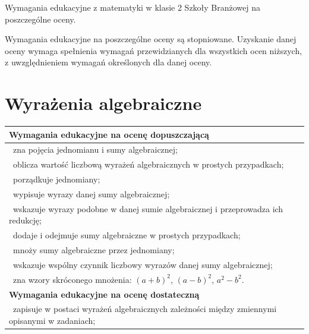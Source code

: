 \documentclass[12pt,a4paper]{article}
\begin{document}
	
	\begin{center}
		\Large Wymagania edukacyjne z matematyki w klasie 2 Szkoły Branżowej na poszczególne oceny.
	\end{center}
	
	Wymagania edukacyjne na poszczególne oceny są stopniowane.
	Uzyskanie danej oceny wymaga spełnienia wymagań przewidzianych
	dla wszystkich ocen niższych, z uwzględnieniem wymagań
	określonych dla danej oceny.
	
	\section{Wyrażenia algebraiczne}
	
	\begin{longtable}{|p{16cm}|}
		\hline
		
		\textbf{Wymagania edukacyjne na ocenę dopuszczającą} \\ \hline
		
		\textbullet\ zna pojęcia jednomianu i sumy algebraicznej; \\
		
		\textbullet\ oblicza wartość liczbową wyrażeń algebraicznych w prostych przypadkach; \\
		
		\textbullet\ porządkuje jednomiany; \\
		
		\textbullet\ wypisuje wyrazy danej sumy algebraicznej; \\
		
		\textbullet\ wskazuje wyrazy podobne w danej sumie algebraicznej i przeprowadza ich redukcję; \\
		
		\textbullet\ dodaje i odejmuje sumy algebraiczne w prostych przypadkach; \\
		
		\textbullet\ mnoży sumy algebraiczne przez jednomiany; \\
		
		\textbullet\ wskazuje wspólny czynnik liczbowy wyrazów danej sumy algebraicznej; \\
		
		\textbullet\ zna wzory skróconego mnożenia: $(a+b)^2$, $(a-b)^2$, $a^2-b^2$. \\ \hline
		
		\textbf{Wymagania edukacyjne na ocenę dostateczną} \\ \hline
		
		\textbullet\ zapisuje w postaci wyrażeń algebraicznych zależności między zmiennymi opisanymi w zadaniach; \\
		

\end{longtable}
\end{document}
